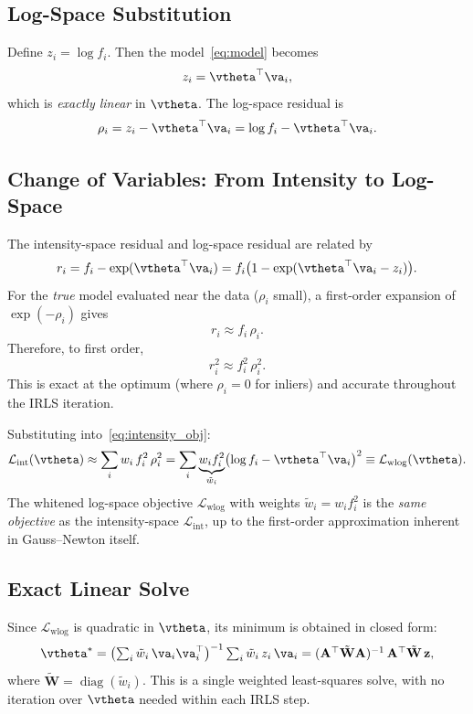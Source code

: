 \subsection{Log-Space Substitution}

Define $z_i = \log f_i$.  Then the model~\eqref{eq:model} becomes
\begin{equation}\label{eq:logmodel}
  z_i = \vtheta^\top \va_i,
\end{equation}
which is \emph{exactly linear} in $\vtheta$.  The log-space residual is
\[
  \rho_i = z_i - \vtheta^\top \va_i = \log f_i - \vtheta^\top \va_i.
\]

\subsection{Change of Variables: From Intensity to Log-Space}

The intensity-space residual and log-space residual are related by
\[
  r_i = f_i - \exp(\vtheta^\top \va_i)
  = f_i\bigl(1 - \exp(\vtheta^\top \va_i - z_i)\bigr).
\]
For the \emph{true} model evaluated near the data ($\rho_i$ small),
a first-order expansion of $\exp(-\rho_i)$ gives
\[
  r_i \approx f_i\, \rho_i.
\]
Therefore, to first order,
\begin{equation}\label{eq:equiv}
  r_i^2 \approx f_i^2\, \rho_i^2.
\end{equation}
This is exact at the optimum (where $\rho_i = 0$ for inliers) and
accurate throughout the IRLS iteration.

Substituting into~\eqref{eq:intensity_obj}:
\begin{equation}\label{eq:whitened_obj}
  \mathcal{L}_{\mathrm{int}}(\vtheta)
  \approx \sum_i w_i\, f_i^2\, \rho_i^2
  = \sum_i \underbrace{w_i f_i^2}_{\tilde{w}_i}
    \bigl(\log f_i - \vtheta^\top \va_i\bigr)^2
  \equiv \mathcal{L}_{\mathrm{wlog}}(\vtheta).
\end{equation}
The whitened log-space objective $\mathcal{L}_{\mathrm{wlog}}$ with
weights $\tilde{w}_i = w_i f_i^2$ is the \emph{same objective} as the
intensity-space $\mathcal{L}_{\mathrm{int}}$, up to the first-order
approximation inherent in Gauss--Newton itself.

\subsection{Exact Linear Solve}

Since $\mathcal{L}_{\mathrm{wlog}}$ is quadratic in $\vtheta$, its
minimum is obtained in closed form:
\begin{equation}\label{eq:wls}
  \vtheta^*
  = \bigl(\textstyle\sum_i \tilde{w}_i\, \va_i \va_i^\top\bigr)^{-1}
    \sum_i \tilde{w}_i\, z_i\, \va_i
  = (\mathbf{A}^\top \tilde{\mathbf{W}} \mathbf{A})^{-1}\,
    \mathbf{A}^\top \tilde{\mathbf{W}}\, \mathbf{z},
\end{equation}
where $\tilde{\mathbf{W}} = \operatorname{diag}(\tilde{w}_i)$.  This is
a single weighted least-squares solve, with no iteration over $\vtheta$
needed within each IRLS step.

